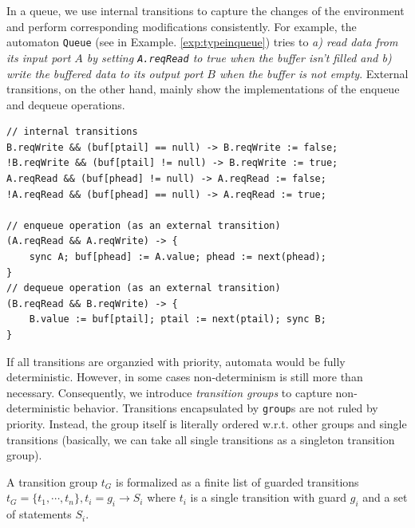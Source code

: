 \begin{example} In a queue, we use internal transitions to capture the changes of the environment and perform corresponding modifications consistently. For example, the automaton \texttt{Queue} (see in Example. \ref{exp:typeinqueue}) tries to \emph{a) read data from its input port $A$ by setting \texttt{A.reqRead} to \emph{true} when the buffer isn't filled and b) write the buffered data to its output port $B$ when the buffer is not empty}. External transitions, on the other hand, mainly show the implementations of the enqueue and dequeue operations.
\begin{lstlisting}
// internal transitions
B.reqWrite && (buf[ptail] == null) -> B.reqWrite := false;
!B.reqWrite && (buf[ptail] != null) -> B.reqWrite := true;
A.reqRead && (buf[phead] != null) -> A.reqRead := false;
!A.reqRead && (buf[phead] == null) -> A.reqRead := true;

// enqueue operation (as an external transition)
(A.reqRead && A.reqWrite) -> {
    sync A; buf[phead] := A.value; phead := next(phead);
}
// dequeue operation (as an external transition)
(B.reqRead && B.reqWrite) -> {
    B.value := buf[ptail]; ptail := next(ptail); sync B;
}
\end{lstlisting}
\label{exp:trans_queue}
\end{example}

If all transitions are organzied with priority, automata would be fully deterministic. However, in some cases non-determinism is still more than necessary. Consequently, we introduce \emph{transition groups} to capture non-deterministic behavior. Transitions encapsulated by \texttt{group}s are not ruled by priority. Instead, the group itself is literally ordered w.r.t. other groups and single transitions (basically, we can take all single transitions as a singleton transition group).


A transition group $t_G$ is formalized as a finite list of guarded transitions
$t_G=\{t_1,\cdots, t_n\}, t_i=g_i\rightarrow S_i$
where $t_i$ is a single transition with guard $g_i$ and a set of statements $S_i$.

